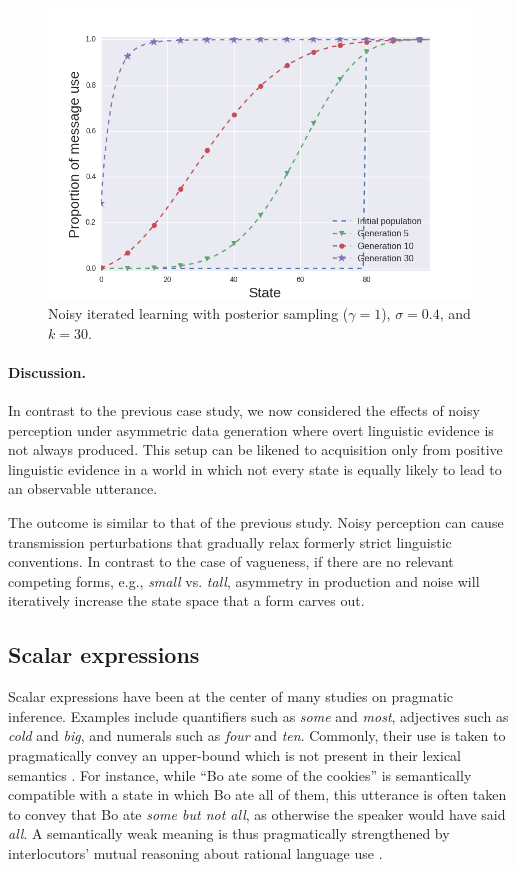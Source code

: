 \documentclass[10pt,a4paper]{article}
\newcommand{\postparameter}{\ensuremath{\gamma}}
\begin{document}
\begin{figure}[ht]
\centering
    \includegraphics[scale=0.4]{../code/plots/deflation-sigma04.png}
  \caption{Noisy iterated learning with posterior sampling ($\postparameter=1$), $\sigma = 0.4$, and $k = 30$.}
  \label{fig:defl}
\end{figure}

\paragraph{Discussion.} In contrast to the previous case study, we now considered the effects
of noisy perception under asymmetric data generation where overt linguistic evidence is not
always produced. This setup can be likened to acquisition only from positive linguistic
evidence in a world in which not every state is equally likely to lead to an observable
utterance. %

The outcome is similar to that of the previous study. Noisy perception can cause transmission
perturbations that gradually relax formerly strict linguistic conventions. In contrast to the
case of vagueness, if there are no relevant competing forms, e.g., {\em small} vs. {\em tall},
asymmetry in production and noise will iteratively increase the state space that a form carves
out.

\subsection{Scalar expressions}
Scalar expressions have been at the center of many studies on pragmatic inference. Examples
include quantifiers such as {\em some} and {\em most}, adjectives such as {\em cold} and {\em
  big}, and numerals such as {\em four} and {\em ten}. Commonly, their use is taken to
pragmatically convey an upper-bound which is not present in their lexical semantics
\citep{horn:1972,gazdar:1979}. For instance, while ``Bo ate some of the cookies'' is
semantically compatible with a state in which Bo ate all of them, this utterance is often taken to convey 
that Bo ate {\em some but not all}, as otherwise the speaker would have said {\em all}. A
semantically weak meaning is thus pragmatically strengthened by interlocutors' mutual reasoning
about rational language use \citep{grice:1975}. 
\end{document}
